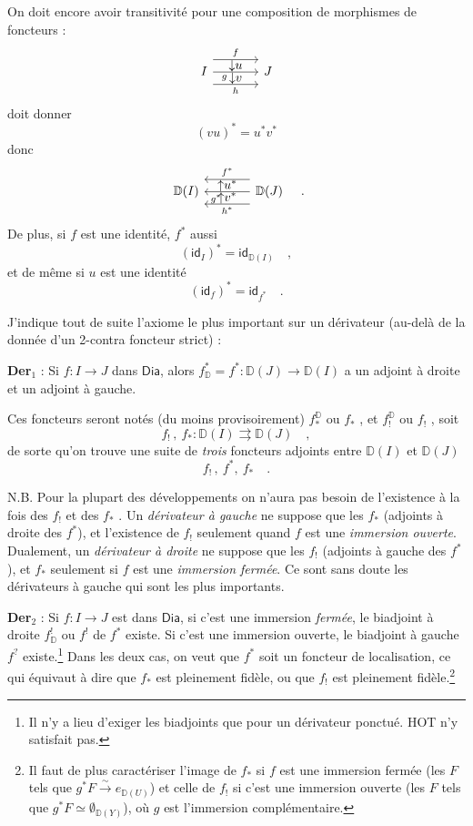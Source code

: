 \documentclass[11pt]{article}
\newcommand{\printedpage}[1]{\marginpar{\footnotesize p.~#1}}
\newcommand{\msp}[1]{\marginpar{\footnotesize [#1]}}
\newcommand{\Dia}{\mathsf{Dia}}
\newcommand{\DD}{\mathbb{D}}
\newcommand{\id}{\mathsf{id}}
\begin{document}
\printedpage{5}

On doit encore avoir transitivité pour une composition de morphismes de foncteurs :
\[
\begin{tikzcd}[column sep=large]
I \arrow[r, shift left=4, "f"] \arrow[r, "g"' near start] \arrow[r, shift right=4, "h"'] \arrow[r, phantom, shift left=2, "{\downarrow}u"] \arrow[r, phantom, shift right=2, "{\downarrow}v"] & J
\end{tikzcd}
\]
doit donner
\[ (vu)^* = u^*v^* \]
donc
\[
\begin{tikzcd}[column sep=large]
\DD(I) & \DD(J) \arrow[l, shift right=4, "f^*"'] \arrow[l, "g^*" near end] \arrow[l, shift left=4, "h^*"] \arrow[l, phantom, shift right=2, "{\uparrow}u^*"] \arrow[l, phantom, shift left=2, "{\uparrow}v^*"]
\end{tikzcd}
\quad .
\]
De plus, si $f$ est une identité, $f^*$ aussi
\[ (\id_I)^* = \id_{\DD(I)} \quad , \]
et de même si $u$ est une identité
\[ (\id_f)^* = \id_{f^*} \quad . \]

\msp{page 6}

J'indique tout de suite l'axiome le plus important sur un dérivateur (au-delà de la donnée d'un 2-contra foncteur strict) :

\textbf{Der}$_1$ : Si $f : I \to J$ dans $\Dia$, alors $f^*_{\DD} = f^* : \DD(J) \to \DD(I)$ a un adjoint à droite et un adjoint à gauche.

Ces foncteurs seront notés (du moins provisoirement) $f^{\DD}_*$ ou $f_*$ , et $f^{\DD}_!$ ou $f_!$ , soit
\[ f_! \, , \ f_* : \DD(I) \rightrightarrows \DD(J) \quad , \]
de sorte qu'on trouve une suite de \textit{trois} foncteurs adjoints entre $\DD(I)$ et $\DD(J)$
\[ f_! \, , \ f^*, \ f_* \quad . \]

N.B. Pour la plupart des développements on n'aura pas besoin de l'existence à la fois des $f_!$ et des $f_*$ . Un \textit{dérivateur à gauche} ne suppose que les $f_*$ (adjoints à droite des $f^*$), et l'existence de $f_!$ seulement quand $f$ est une \textit{immersion ouverte}. Dualement, un \textit{dérivateur à droite} ne suppose que les $f_!$ (adjoints à gauche des $f^*$), et $f_*$ seulement si $f$ est une \textit{immersion fermée}. Ce sont sans doute les dérivateurs à gauche qui sont les plus importants.

\msp{page 7}

\textbf{Der}$_2$ : Si $f : I \to J$ est dans $\Dia$, si c'est une immersion \textit{fermée}, le biadjoint à droite $f^!_{\DD}$ ou $f^!$ de $f^*$ existe. Si c'est une immersion ouverte, le biadjoint à gauche $f^?$ existe.\footnote{Il n'y a lieu d'exiger les biadjoints que pour un dérivateur ponctué. \textsf{HOT} n'y satisfait pas.} Dans
\printedpage{6}
les deux cas, on veut que $f^*$ soit un foncteur de localisation, ce qui équivaut à dire que $f_*$ est pleinement fidèle, ou que $f_!$ est pleinement fidèle.\footnote{Il faut de plus caractériser l'image de $f_*$ si $f$ est une immersion fermée (les $F$ tels que $g^*F \overset{\sim}{\to} e_{\DD(U)}$) et celle de $f_!$ si c'est une immersion ouverte (les $F$ tels que $g^*F \simeq \emptyset_{\DD(Y)}$), où $g$ est l'immersion complémentaire.}
\end{document}
